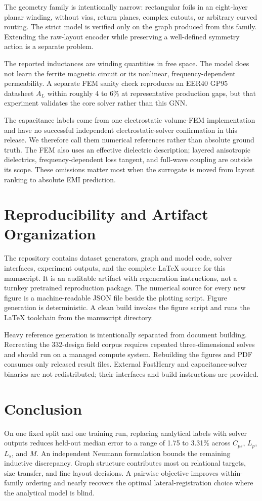 \documentclass[letterpaper,twocolumn,9pt]{extarticle}
\newcommand{\Cps}{C_{ps}}
\newcommand{\Lp}{L_p}
\newcommand{\Ls}{L_s}
\newcommand{\Mut}{M}
\begin{document}
The geometry family is intentionally narrow: rectangular foils in an eight-layer planar winding, without vias, return planes, complex cutouts, or arbitrary curved routing. The strict model is verified only on the graph produced from this family. Extending the raw-layout encoder while preserving a well-defined symmetry action is a separate problem.

The reported inductances are winding quantities in free space. The model does not learn the ferrite magnetic circuit or its nonlinear, frequency-dependent permeability. A separate FEM sanity check reproduces an EER40 GP95 datasheet $A_L$ within roughly 4 to 6\% at representative production gaps, but that experiment validates the core solver rather than this GNN.

The capacitance labels come from one electrostatic volume-FEM implementation and have no successful independent electrostatic-solver confirmation in this release. We therefore call them numerical references rather than absolute ground truth. The FEM also uses an effective dielectric description; layered anisotropic dielectrics, frequency-dependent loss tangent, and full-wave coupling are outside its scope. These omissions matter most when the surrogate is moved from layout ranking to absolute EMI prediction.

\section{Reproducibility and Artifact Organization}
The repository contains dataset generators, graph and model code, solver interfaces, experiment outputs, and the complete LaTeX source for this manuscript. It is an auditable artifact with regeneration instructions, not a turnkey pretrained reproduction package. The numerical source for every new figure is a machine-readable JSON file beside the plotting script. Figure generation is deterministic. A clean build invokes the figure script and runs the LaTeX toolchain from the manuscript directory.

Heavy reference generation is intentionally separated from document building. Recreating the 332-design field corpus requires repeated three-dimensional solves and should run on a managed compute system. Rebuilding the figures and PDF consumes only released result files. External FastHenry and capacitance-solver binaries are not redistributed; their interfaces and build instructions are provided.

\section{Conclusion}
On one fixed split and one training run, replacing analytical labels with solver outputs reduces held-out median error to a range of 1.75 to 3.31\% across $\Cps$, $\Lp$, $\Ls$, and $\Mut$. An independent Neumann formulation bounds the remaining inductive discrepancy. Graph structure contributes most on relational targets, size transfer, and fine layout decisions. A pairwise objective improves within-family ordering and nearly recovers the optimal lateral-registration choice where the analytical model is blind.
\end{document}
